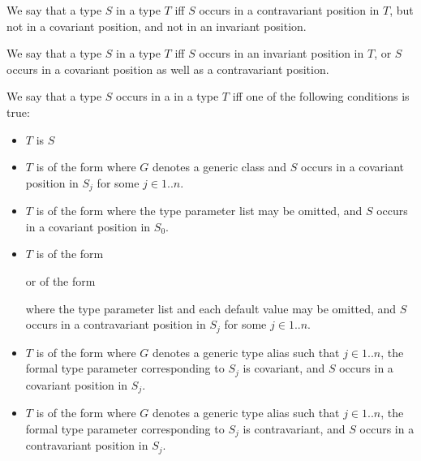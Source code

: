\documentclass[makeidx]{article}
\begin{document}
\LMHash{}%
We say that a type $S$  in a type $T$ if{}f
$S$ occurs in a contravariant position in $T$,
but not in a covariant position,
and not in an invariant position.

\LMHash{}%
We say that a type $S$  in a type $T$ if{}f
$S$ occurs in an invariant position in $T$,
or $S$ occurs in a covariant position as well as a contravariant position.

\LMHash{}%
We say that a type $S$ occurs in a  in a type $T$
if{}f one of the following conditions is true:

\begin{itemize}
\item $T$ is $S$

\item $T$ is of the form 
  where $G$ denotes a generic class
  and $S$ occurs in a covariant position in $S_j$ for some $j \in 1 .. n$.

\item $T$ is of the form
  where the type parameter list may be omitted,
  and $S$ occurs in a covariant position in $S_0$.

\item $T$ is of the form



  \noindent
  or of the form



  \noindent
  where the type parameter list and each default value may be omitted,
  and $S$ occurs in a contravariant position in $S_j$
  for some $j \in 1 .. n$.

\item $T$ is of the form 
  where $G$ denotes a generic type alias such that
  $j \in 1 .. n$,
  the formal type parameter corresponding to $S_j$ is covariant,
  and $S$ occurs in a covariant position in $S_j$.

\item $T$ is of the form 
  where $G$ denotes a generic type alias such that
  $j \in 1 .. n$,
  the formal type parameter corresponding to $S_j$ is contravariant,
  and $S$ occurs in a contravariant position in $S_j$.
\end{itemize}
\end{document}
